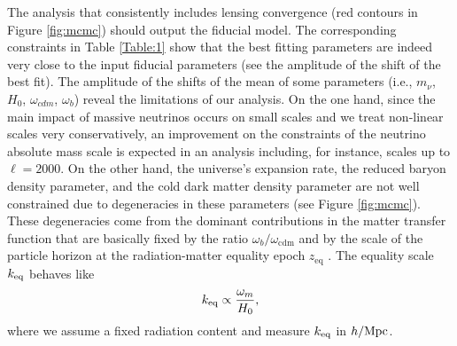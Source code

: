 The analysis that consistently includes lensing convergence (red contours in Figure \ref{fig:mcmc}) should output the fiducial model. The corresponding constraints in Table \ref{Table:1} show that the best fitting parameters are indeed very close to the input fiducial parameters (see the amplitude of the shift of the best fit). The amplitude of the shifts of the mean of some parameters (i.e., $m_\nu$, $H_0$, $\omega_{cdm}$, $\omega_b$) reveal the limitations of our analysis. On the one hand, since the main impact of massive neutrinos occurs on small scales and we treat non-linear scales very conservatively, an improvement on the constraints of the neutrino absolute mass scale is expected in an analysis including, for instance, scales up to $\ell=2000$. On the other hand, the universe's expansion rate, the reduced baryon density parameter, and the cold dark matter density parameter are not well constrained due to degeneracies in these parameters (see Figure \ref{fig:mcmc}). These degeneracies come from the dominant contributions in the matter transfer function that are basically fixed by the ratio $\omega_b/\omega_{\mathrm{cdm}}$ and by the scale of the particle horizon at the radiation-matter equality epoch $z_{\mathrm{eq}}$ \cite{Eisenstein:1997ik}. The equality scale $k_{\rm eq}$ behaves like  
\begin{equation}
k_{\rm eq} \propto \frac{\omega_m}{H_0},
\end{equation}      
where we assume a fixed radiation content and measure $k_{\rm eq}$ in $h/ \mathrm{Mpc}$.  

